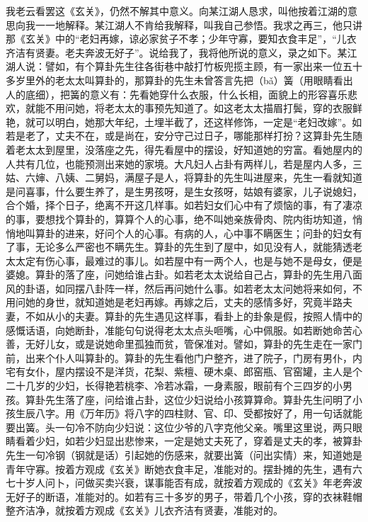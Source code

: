 \documentclass[12pt,UTF8]{ctexbook}
\begin{document}
我老云看罢这《玄关》，仍然不解其中意义。向某江湖人恳求，叫他按着江湖的意思向我一一地解释。某江湖人不肯给我解释，叫我自己参悟。我求之再三，他只讲那《玄关》中的“老妇再嫁，谅必家贫子不孝；少年守寡，要知衣食丰足”，“儿衣齐洁有贤妻。老夫奔波无好子”。说给我了，我将他所说的意义，录之如下。某江湖人说：譬如，有个算卦先生往各街巷中敲打竹板兜揽主顾，有一家出来一位五十多岁里外的老太太叫算卦的，那算卦的先生未曾答言先把（bǎ）簧（用眼睛看出人的底细），把簧的意义有：先看她穿什么衣服，什么长相，面貌上的形容喜乐悲欢，就能不用问她，将老太太的事预先知道了。如这老太太描眉打鬓，穿的衣服鲜艳，就可以明白，她那大年纪，土埋半截了，还这样修饰，一定是“老妇改嫁”。如若是老了，丈夫不在，或是尚在，安分守己过日子，哪能那样打扮？这算卦先生随着老太太到屋里，没落座之先，得先看屋中的摆设，好知道她的穷富。看她屋内的人共有几位，也能预测出来她的家境。大凡妇人占卦有两样儿，若是屋内人多，三姑、六婶、八姨、二舅妈，满屋子是人，将算卦的先生叫进屋来，先生一看就知道是问喜事，什么要生养了，是生男孩呀，是生女孩呀，姑娘有婆家，儿子说媳妇，合个婚，择个日子，绝离不开这几样事。如若妇女们心中有了烦恼的事，有了凄凉的事，要想找个算卦的，算算个人的心事，绝不叫她亲族骨肉、院内街坊知道，悄悄地叫算卦的进来，好问个人的心事。有病的人，心中事不瞒医生；问卦的妇女有了事，无论多么严密也不瞒先生。算卦的先生到了屋中，如见没有人，就能猜透老太太定有伤心事，最难过的事儿。如若屋中有一两个人，也是与她不是母女，便是婆媳。算卦的落了座，问她给谁占卦。如若老太太说给自己占，算卦的先生用八面风的卦语，如同摆八卦阵一样，然后再问她什么事。如若老太太问她将来如何，不用问她的身世，就知道她是老妇再嫁。再嫁之后，丈夫的感情多好，究竟半路夫妻，不如从小的夫妻。算卦的先生遇见这样事，看卦上的卦象是假，按照人情中的感慨话语，向她断卦，准能句句说得老太太点头咂嘴，心中佩服。如若断她命苦心善，无好儿女，或是说她命里孤独而贫，管保准对。譬如，算卦的先生走在一家门前，出来个仆人叫算卦的。算卦的先生看他门户整齐，进了院子，门房有男仆，内宅有女仆，屋内摆设不是洋货，花梨、紫檀、硬木桌、郎窑瓶、官窑罐，主人是个二十几岁的少妇，长得艳若桃李、冷若冰霜，一身素服，眼前有个三四岁的小男孩。算卦先生落了座，问给谁占卦，这位少妇说给小孩算算命。算卦先生问明了小孩生辰八字。用《万年历》将八字的四柱财、官、印、受都按好了，用一句话就能要出簧。头一句冷不防向少妇说：这位少爷的八字克他父亲。嘴里这里说，两只眼睛看着少妇，如若少妇显出悲惨来，一定是她丈夫死了，穿着是丈夫的孝，被算卦先生一句冷钢（钢就是话）引起她的伤感来，就要出簧（问出实情）来，知道她是青年守寡。按着方观成《玄关》断她衣食丰足，准能对的。摆卦摊的先生，遇有六七十岁人问卜，问做买卖兴衰，谋事能否有成，就按着方观成的《玄关》年老奔波无好子的断语，准能对的。如若有三十多岁的男子，带着几个小孩，穿的衣袜鞋帽整齐洁净，就按着方观成《玄关》儿衣齐洁有贤妻，准能对的。
\end{document}
